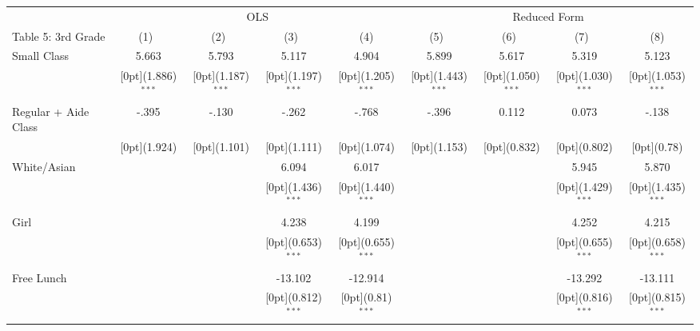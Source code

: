 \documentclass[a4paper,11pt]{article}
\begin{document}
\begin{table}[H]
	\setlength\tabcolsep{1.75pt}
\begin{tabular*}{\textwidth}{@{\extracolsep{\fill}}lcccccccc}			& \multicolumn{4}{c}{OLS}  & \multicolumn{4}{c}{Reduced Form}\\
	\cline{2-5}	\cline{6-9}			
	Table 5: 3rd Grade & \multicolumn{1}{c}{(1)\mbox{\ }} &	\multicolumn{1}{c}{(2)\mbox{\ }} &	\multicolumn{1}{c}{(3)\mbox{\ }} &	\multicolumn{1}{c}{(4)} & \multicolumn{1}{c}{(5)\mbox{\ }} &	\multicolumn{1}{c}{(6)\mbox{\ }} &	\multicolumn{1}{c}{(7)\mbox{\ }} &	\multicolumn{1}{c}{(8)} \\
	\hline						
	Small Class &	5.663 &	5.793 &	5.117 &	4.904 &	5.899 &	5.617 &	5.319 &	5.123 \\
	&	\raisebox{.7ex}[0pt]{\scriptsize (1.886)$^{***}$} &	\raisebox{.7ex}[0pt]{\scriptsize (1.187)$^{***}$} &	\raisebox{.7ex}[0pt]{\scriptsize (1.197)$^{***}$} &	\raisebox{.7ex}[0pt]{\scriptsize (1.205)$^{***}$} 
	&	\raisebox{.7ex}[0pt]{\scriptsize (1.443)$^{***}$} &	\raisebox{.7ex}[0pt]{\scriptsize (1.050)$^{***}$} &	\raisebox{.7ex}[0pt]{\scriptsize (1.030)$^{***}$} &	\raisebox{.7ex}[0pt]{\scriptsize (1.053)$^{***}$}\\
	Regular + Aide Class &	-.395 &	-.130 &	-.262 &	-.768 &	-.396 &	0.112 &	0.073 &	-.138 \\
	&	\raisebox{.7ex}[0pt]{\scriptsize (1.924)} &	\raisebox{.7ex}[0pt]{\scriptsize (1.101)} &	\raisebox{.7ex}[0pt]{\scriptsize (1.111)} &	\raisebox{.7ex}[0pt]{\scriptsize (1.074)} 	&	\raisebox{.7ex}[0pt]{\scriptsize (1.153)} &	\raisebox{.7ex}[0pt]{\scriptsize (0.832)} &	\raisebox{.7ex}[0pt]{\scriptsize (0.802)} &	\raisebox{.7ex}[0pt]{\scriptsize (0.78)}\\
	White/Asian &	&	&	6.094 &	6.017 &	&	&	5.945 &	5.870 \\
	&	&	&	\raisebox{.7ex}[0pt]{\scriptsize (1.436)$^{***}$} &	\raisebox{.7ex}[0pt]{\scriptsize (1.440)$^{***}$}	&	&	&	\raisebox{.7ex}[0pt]{\scriptsize (1.429)$^{***}$} &	\raisebox{.7ex}[0pt]{\scriptsize (1.435)$^{***}$} \\
	Girl &	&	&	4.238 &	4.199 &	&	&	4.252 &	4.215\\
	&	&	&	\raisebox{.7ex}[0pt]{\scriptsize (0.653)$^{***}$} &	\raisebox{.7ex}[0pt]{\scriptsize (0.655)$^{***}$} &	&	&	\raisebox{.7ex}[0pt]{\scriptsize (0.655)$^{***}$} &	\raisebox{.7ex}[0pt]{\scriptsize (0.658)$^{***}$} \\
	Free Lunch &	&	&	-13.102 &	-12.914 &	&	&	-13.292 &	-13.111 \\
	&	&	&	\raisebox{.7ex}[0pt]{\scriptsize (0.812)$^{***}$} &	\raisebox{.7ex}[0pt]{\scriptsize (0.81)$^{***}$} 	&	&	&	\raisebox{.7ex}[0pt]{\scriptsize (0.816)$^{***}$} &	\raisebox{.7ex}[0pt]{\scriptsize (0.815)$^{***}$}\\

\end{tabular*}
\end{table}
\end{document}
